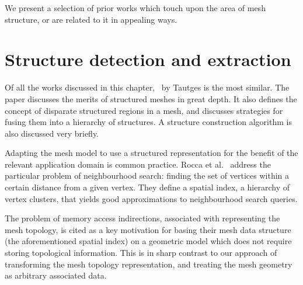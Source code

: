 We present a selection of prior works which touch upon the area of mesh structure, or are related to it in appealing ways.





\section{Structure detection and extraction}


Of all the works discussed in this chapter, \cite{tautges2004moab}~by Tautges is the most similar. The paper discusses the merits of structured meshes in great depth. It also defines the concept of disparate structured regions in a mesh, and discusses strategies for fusing them into a hierarchy of structures. A structure construction algorithm is also discussed very briefly.




Adapting the mesh model to use a structured representation for the benefit of the relevant application domain is common practice.
Rocca et al.~\cite{rocca2011fast} address the particular problem of neighbourhood search: finding the set of vertices within a certain distance from a given vertex. They define a spatial index, a hierarchy of vertex clusters, that yields good approximations to neighbourhood search queries.

The problem of memory access indirections, associated with representing the mesh topology, is cited as a key motivation for basing their mesh data structure (the aforementioned spatial index) on a geometric model which does not require storing topological information. This is in sharp contrast to our approach of transforming the mesh topology representation, and treating the mesh geometry as arbitrary associated data.



